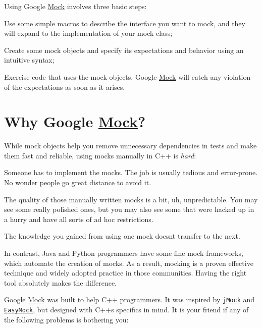Using Google \hyperlink{class_mock}{Mock} involves three basic steps\+:


\begin{DoxyEnumerate}
\item Use some simple macros to describe the interface you want to mock, and they will expand to the implementation of your mock class;
\end{DoxyEnumerate}
\begin{DoxyEnumerate}
\item Create some mock objects and specify its expectations and behavior using an intuitive syntax;
\end{DoxyEnumerate}
\begin{DoxyEnumerate}
\item Exercise code that uses the mock objects. Google \hyperlink{class_mock}{Mock} will catch any violation of the expectations as soon as it arises.
\end{DoxyEnumerate}

\section*{Why Google \hyperlink{class_mock}{Mock}?}

While mock objects help you remove unnecessary dependencies in tests and make them fast and reliable, using mocks manually in C++ is {\itshape hard}\+:


\begin{DoxyItemize}
\item Someone has to implement the mocks. The job is usually tedious and error-\/prone. No wonder people go great distance to avoid it.
\item The quality of those manually written mocks is a bit, uh, unpredictable. You may see some really polished ones, but you may also see some that were hacked up in a hurry and have all sorts of ad hoc restrictions.
\item The knowledge you gained from using one mock doesn\textquotesingle{}t transfer to the next.
\end{DoxyItemize}

In contrast, Java and Python programmers have some fine mock frameworks, which automate the creation of mocks. As a result, mocking is a proven effective technique and widely adopted practice in those communities. Having the right tool absolutely makes the difference.

Google \hyperlink{class_mock}{Mock} was built to help C++ programmers. It was inspired by \href{http://www.jmock.org/}{\tt j\+Mock} and \href{http://www.easymock.org/}{\tt Easy\+Mock}, but designed with C++\textquotesingle{}s specifics in mind. It is your friend if any of the following problems is bothering you\+:



